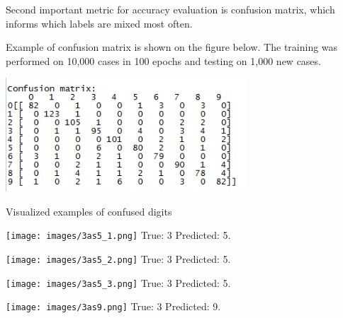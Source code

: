 \documentclass[a4paper]{scrartcl}
\begin{document}
\par Second important metric for accuracy evaluation is confusion matrix, which informs which labels are mixed most often. 
\par Example of confusion matrix is shown on the figure below. The training was performed on 10,000 cases in 100 epochs and testing on 1,000 new cases.
\begin{center}
\includegraphics[width=9cm]{images/conf_matrix.png}
\end{center}
\par Visualized examples of confused digits
\vspace{1em}
\par
\begin{minipage}[t]{0.2\textwidth}
\begin{center}
\texttt{[image: images/3as5\_1.png]}
\newline True: 3 \newline Predicted: 5.
\end{center}
\end{minipage}
\begin{minipage}[t]{0.2\textwidth}
\begin{center}
\texttt{[image: images/3as5\_2.png]}
\newline True: 3 \newline Predicted: 5.
\end{center}
\end{minipage}
\begin{minipage}[t]{0.2\textwidth}
\begin{center}
\texttt{[image: images/3as5\_3.png]}
\newline True: 3 \newline Predicted: 5.
\end{center}
\end{minipage}
\begin{minipage}[t]{0.2\textwidth}
\begin{center}
\texttt{[image: images/3as9.png]}
\newline True: 3 \newline Predicted: 9.
\end{center}
\end{minipage}
\end{document}
